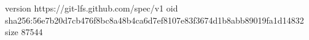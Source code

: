 version https://git-lfs.github.com/spec/v1
oid sha256:56e7b20d7cb476f8bc8a48b4ca6d7ef8107e83f3674d1b8abb89019fa1d14832
size 87544
